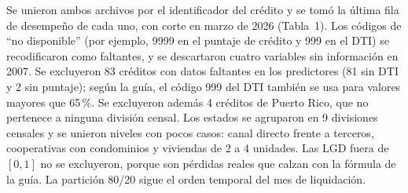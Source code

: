 Se unieron ambos archivos por el identificador del crédito y se tomó la última fila de
desempeño de cada uno, con corte en marzo de 2026 (Tabla~1). Los códigos de ``no disponible''
(por ejemplo, 9999 en el puntaje de crédito y 999 en el DTI) se recodificaron como faltantes, y
se descartaron cuatro variables sin información en 2007. Se excluyeron 83 créditos con datos
faltantes en los predictores (81 sin DTI y 2 sin puntaje); según la guía, el código 999 del DTI
también se usa para valores mayores que 65\,\%. Se excluyeron además 4 créditos de Puerto Rico,
que no pertenece a ninguna división censal. Los estados se agruparon en 9 divisiones censales y
se unieron niveles con pocos casos: canal directo frente a terceros, cooperativas con
condominios y viviendas de 2 a 4 unidades. Las LGD fuera de $[0, 1]$ no se excluyeron, porque
son pérdidas reales que calzan con la fórmula de la guía. La partición 80/20 sigue el orden
temporal del mes de liquidación.
